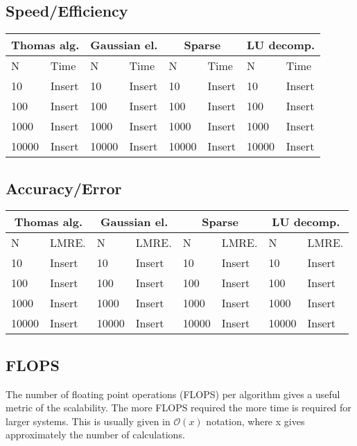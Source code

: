 \documentclass[11pt,a4paper,english,final]{article}
\numberwithin{equation}{section}
\newcommand{\bigO}[1]{\mathcal{O}\left( #1 \right)}
\begin{document}
\subsection{Speed/Efficiency}

\begin{tabular}{|l|l|l|l|l|l|l|l|}
\hline
\multicolumn{2}{|c|}{Thomas alg.} & \multicolumn{2}{|c|}{Gaussian el.} & \multicolumn{2}{|c|}{Sparse} & \multicolumn{2}{|c|}{LU decomp.} \\
\hline
N & Time & N & Time & N & Time & N & Time  \\
\hline
10 & Insert & 10 & Insert & 10 & Insert &  10 & Insert \\
100 & Insert & 100 & Insert & 100 & Insert & 100 & Insert \\
1000 & Insert & 1000 & Insert & 1000 & Insert & 1000 & Insert \\
10000 & Insert & 10000 & Insert & 10000 & Insert & 10000 & Insert \\
\hline
\end{tabular}

\subsection{Accuracy/Error}

\begin{tabular}{|l|l|l|l|l|l|l|l|}
\hline
\multicolumn{2}{|c|}{Thomas alg.} & \multicolumn{2}{|c|}{Gaussian el.} & \multicolumn{2}{|c|}{Sparse} & \multicolumn{2}{|c|}{LU decomp.} \\
\hline
N & LMRE. & N & LMRE. & N & LMRE. & N & LMRE.  \\
\hline
10 & Insert & 10 & Insert & 10 & Insert &  10 & Insert \\
100 & Insert & 100 & Insert & 100 & Insert & 100 & Insert \\
1000 & Insert & 1000 & Insert & 1000 & Insert & 1000 & Insert \\
10000 & Insert & 10000 & Insert & 10000 & Insert & 10000 & Insert \\
\hline
\end{tabular}


\subsection{FLOPS}

The number of floating point operations (FLOPS) per algorithm gives a useful 
metric of the scalability. The more FLOPS required the more time is
required for larger systems. This is usually given in $\bigO{x}$ notation,
where x gives approximately the number of calculations.
\end{document}
